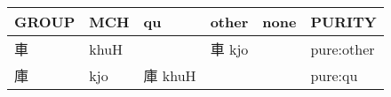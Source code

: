 \documentclass[14pt,a4paper]{scrartcl}
\begin{document}
\begin{longtable}[c]{@{}llllll@{}}
\toprule
\begin{minipage}[b]{0.14\columnwidth}\raggedright\strut
GROUP
\strut\end{minipage} &
\begin{minipage}[b]{0.14\columnwidth}\raggedright\strut
MCH
\strut\end{minipage} &
\begin{minipage}[b]{0.14\columnwidth}\raggedright\strut
qu
\strut\end{minipage} &
\begin{minipage}[b]{0.14\columnwidth}\raggedright\strut
other
\strut\end{minipage} &
\begin{minipage}[b]{0.14\columnwidth}\raggedright\strut
none
\strut\end{minipage} &
\begin{minipage}[b]{0.14\columnwidth}\raggedright\strut
PURITY
\strut\end{minipage}\tabularnewline
\midrule
\endhead
\begin{minipage}[t]{0.14\columnwidth}\raggedright\strut
車
\strut\end{minipage} &
\begin{minipage}[t]{0.14\columnwidth}\raggedright\strut
khuH
\strut\end{minipage} &
\begin{minipage}[t]{0.14\columnwidth}\raggedright\strut
\strut\end{minipage} &
\begin{minipage}[t]{0.14\columnwidth}\raggedright\strut
車 kjo
\strut\end{minipage} &
\begin{minipage}[t]{0.14\columnwidth}\raggedright\strut
\strut\end{minipage} &
\begin{minipage}[t]{0.14\columnwidth}\raggedright\strut
pure:other
\strut\end{minipage}\tabularnewline
\begin{minipage}[t]{0.14\columnwidth}\raggedright\strut
庫
\strut\end{minipage} &
\begin{minipage}[t]{0.14\columnwidth}\raggedright\strut
kjo
\strut\end{minipage} &
\begin{minipage}[t]{0.14\columnwidth}\raggedright\strut
庫 khuH
\strut\end{minipage} &
\begin{minipage}[t]{0.14\columnwidth}\raggedright\strut
\strut\end{minipage} &
\begin{minipage}[t]{0.14\columnwidth}\raggedright\strut
\strut\end{minipage} &
\begin{minipage}[t]{0.14\columnwidth}\raggedright\strut
pure:qu
\strut\end{minipage}\tabularnewline
\bottomrule
\end{longtable}
\end{document}
